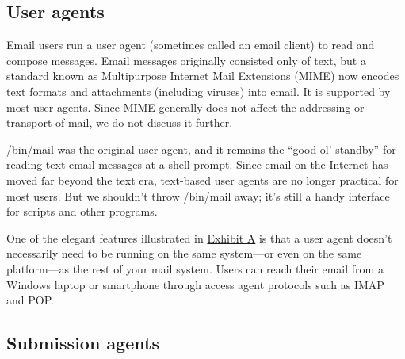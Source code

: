 
\protect\hypertarget{part0026_split_002.html}{}{}

\hypertarget{part0026_split_002.htmlux5cux23_idContainer1247}{}
\hypertarget{part0026_split_002.htmlux5cux23calibre_pb_1}{%
\subsection[User
agents]{\texorpdfstring{\protect\hypertarget{part0026_split_002.htmlux5cux23_idTextAnchor1004}{}{}\protect\hypertarget{part0026_split_002.htmlux5cux23_idIndexMarker2397}{}{}User
agents}{User agents}}\label{part0026_split_002.htmlux5cux23calibre_pb_1}}

\protect\hypertarget{part0026_split_002.htmlux5cux23_idIndexMarker2398}{}{}\protect\hypertarget{part0026_split_002.htmlux5cux23_idIndexMarker2399}{}{}\protect\hypertarget{part0026_split_002.htmlux5cux23_idIndexMarker2400}{}{}\protect\hypertarget{part0026_split_002.htmlux5cux23_idIndexMarker2401}{}{}Email
users run a user agent (sometimes called an email client) to read and
compose messages. Email messages originally consisted only of text, but
a standard known as Multipurpose Internet Mail Extensions (MIME) now
encodes text formats and attachments (including viruses) into email. It
is supported by most user agents. Since MIME generally does not affect
the addressing or transport of mail, we do not discuss it further.

\protect\hypertarget{part0026_split_002.htmlux5cux23_idIndexMarker2402}{}{}{/bin/mail}
was the original user agent, and it remains the ``good ol' standby'' for
reading text email messages at a shell prompt. Since email on the
Internet has moved far beyond the text era, text-based user agents are
no longer practical for most users. But we shouldn't throw {/bin/mail}
away; it's still a handy interface for scripts and other programs.

One of the elegant features illustrated in
\protect\hyperlink{part0026_split_001.htmlux5cux23_idTextAnchor1003}{Exhibit
A} is that a user agent doesn't necessarily need to be running on the
same system---or even on the same platform---as the rest of your mail
system. Users can reach their email from a Windows laptop or smartphone
through access agent protocols such as IMAP and POP.

\protect\hypertarget{part0026_split_003.html}{}{}

\hypertarget{part0026_split_003.htmlux5cux23_idContainer1247}{}
\hypertarget{part0026_split_003.htmlux5cux23calibre_pb_2}{%
\subsection[Submission
agents]{\texorpdfstring{\protect\hypertarget{part0026_split_003.htmlux5cux23_idTextAnchor1005}{}{}Submission
agents}{Submission agents}}\label{part0026_split_003.htmlux5cux23calibre_pb_2}}


